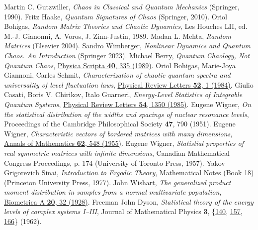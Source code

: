 \documentclass[a4paper,11pt,twoside]{article}
\begin{document}
\begin{thebibliography}{99}
     Martin C. Gutzwiller, {\it Chaos in Classical and Quantum Mechanics} (Springer, 1990).
     Fritz Haake, {\it Quantum Signatures of Chaos} (Springer, 2010).
     Oriol Bohigas, {\it Random Matrix Theories and Chaotic Dynamics}, Les Houches LII, ed. M.-J. Gianonni, A. Voros, J. Zinn-Justin, 1989.
     Madan L. Mehta, {\it Random Matrices} (Elsevier 2004).
     Sandro Wimberger, {\it Nonlinear Dynamics and Quantum Chaos. An Introduction} (Springer 2023).
     Michael Berry, {\it Quantum Chaology, Not Quantum Chaos}, \href{https://iopscience.iop.org/article/10.1088/0031-8949/40/3/013}{Physica Scripta {\bf 40}, 335 (1989)}.
     Oriol Bohigas, Marie-Joya Giannoni, Carles Schmit, {\it Characterization of chaotic quantum spectra and universality of level fluctuation laws}, \href{https://journals.aps.org/prl/abstract/10.1103/PhysRevLett.52.1
    }{Physical Review Letters {\bf 52}, 1 (1984)}.
     Giulio Casati, Boris V. Chirikov, Italo Guarneri, {\it Energy-Level Statistics of Integrable Quantum Systems}, \href{https://journals.aps.org/prl/abstract/10.1103/PhysRevLett.54.1350}{Physical Review Letters {\bf 54}, 1350 (1985)}.
     Eugene Wigner, {\it On the statistical distribution of the widths and spacings of nuclear resonance levels}, Proceedings of the Cambridge Philosophical Society {\bf 47}, 790 (1951).
     Eugene Wigner, {\it Characteristic vectors of bordered matrices with many dimensions}, \href{https://www.jstor.org/stable/1970079}{Annals of Mathematics {\bf 62}, 548 (1955)}.
     Eugene Wigner, {\it Statistial properties of real symmetric matrices with infinite dimensions}, Canadian Mathematical Congress Proceedings, p. 174 (University of Toronto Press, 1957).
     Yakov Grigorevich Sinai, {\it Introduction to Ergodic Theory}, Mathematical Notes (Book 18) (Princeton University Press, 1977).
     John Wishart, {\it The generalized product moment distribution in samples from a normal multivariate population}, \href{https://academic.oup.com/biomet/article-abstract/20A/1-2/32/204365}{Biometrica A {\bf 20}, 32 (1928)}.
     Freeman John Dyson, {\it Statistical theory of the energy levels of complex systems I--III}, Journal of Mathematical Physics {\bf 3}, \{\href{https://aip.scitation.org/doi/10.1063/1.1703773}{140}, \href{https://aip.scitation.org/doi/10.1063/1.1703774}{157}, \href{https://aip.scitation.org/doi/10.1063/1.1703775}{166}\} (1962).

\end{thebibliography}
\end{document}
